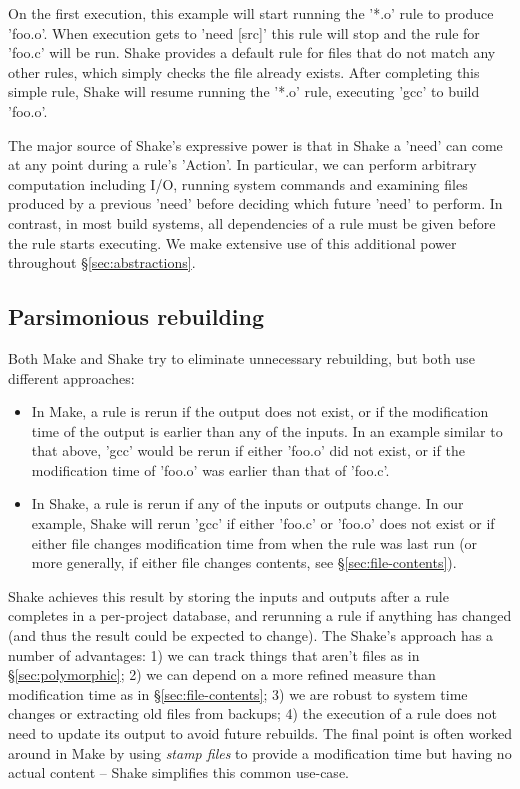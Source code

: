 On the first execution, this example will start running the \lst'*.o' rule to
produce \lst'foo.o'. When execution gets to \lst'need [src]' this rule will stop
and the rule for \lst'foo.c' will be run. Shake provides a default rule for
files that do not match any other rules, which simply checks the file already
exists. After completing this simple rule, Shake will resume running the
\lst'*.o' rule, executing \lst'gcc' to build \lst'foo.o'.

The major source of Shake's expressive power is that in Shake a \lst'need' can
come at any point during a rule's \lst'Action'. In particular, we can perform
arbitrary computation including I/O, running system commands and examining files
produced by a previous \lst'need' before deciding which future \lst'need' to
perform. In contrast, in most build systems, all dependencies of a rule must be
given before the rule starts executing. We make extensive use of this additional
power throughout \S\ref{sec:abstractions}.

\subsection{Parsimonious rebuilding}

Both Make and Shake try to eliminate unnecessary rebuilding, but both use
different approaches:

\begin{itemize}
\item In Make, a rule is rerun if the output does not exist, or if the
modification time of the output is earlier than any of the inputs. In an example
similar to that above, \lst'gcc' would be rerun if either \lst'foo.o' did not
exist, or if the modification time of \lst'foo.o' was earlier than that of
\lst'foo.c'.
\item In Shake, a rule is rerun if any of the inputs or outputs change. In our
example, Shake will rerun \lst'gcc' if either \lst'foo.c' or \lst'foo.o' does
not exist or if either file changes modification time from when the rule was
last run (or more generally, if either file changes contents, see
\S\ref{sec:file-contents}).
\end{itemize}

Shake achieves this result by storing the inputs and outputs after a rule
completes in a per-project database, and rerunning a rule if anything has
changed (and thus the result could be expected to change). The Shake's approach
has a number of advantages: 1) we can track things that aren't files as in
\S\ref{sec:polymorphic}; 2) we can depend on a more refined measure than
modification time as in \S\ref{sec:file-contents}; 3) we are robust to system
time changes or extracting old files from backups; 4) the execution of a rule
does not need to update its output to avoid future rebuilds. The final point is
often worked around in Make by using \emph{stamp files} to provide a modification
time but having no actual content -- Shake simplifies this common use-case.

